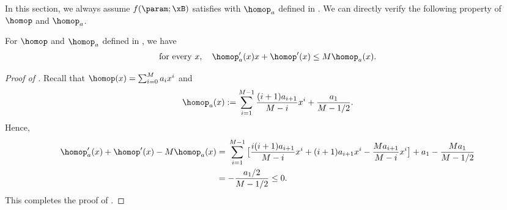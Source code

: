     
 

In this section, we always assume $f(\param; \xB)$ satisfies  with $\homop_a$ defined in . 
We can directly verify the following property of $\homop$ and $\homop_a$.
\begin{lemma}
\label{lem:property-pa}
For $\homop$ and $\homop_a$ defined in , we have
\[
 \text{for every $x$},\quad    \homop_a^\prime (x) x+ \homop^{\prime}(x) \le  M  \homop_a(x). 
\]
\end{lemma}
\begin{proof}[Proof of ] 

Recall that $\homop(x) = \sum_{i=0}^{M}a_i x^i$ and 
\begin{align*}
 \homop_a (x) := \sum_{i=1}^{M-1} \frac{(i+1)a_{i+1}}{M-i} x^{i} + \frac{a_1}{M-1/2}. 
\end{align*}
Hence, 
\begin{align*}
\homop_a^\prime (x) + \homop^\prime (x) - M \homop_a(x)  
&= \, \sum_{i=1}^{M-1}  \big[\frac{i(i+1)a_{i+1}}{M-i} x^{i} + (i+1)a_{i+1} x^i - \frac{M a_{i+1}}{M-i}x^i  \big] + a_1 -  \frac{Ma_1}{M-1/2} \\
&= -\frac{a_1/2}{M-1/2} \le 0. 
\end{align*}
This completes the proof of .
\end{proof}

